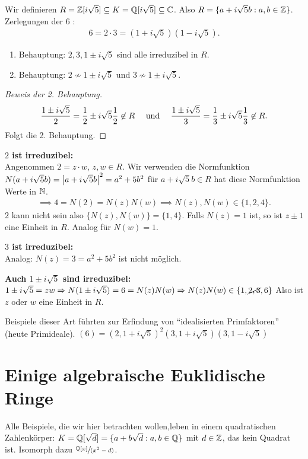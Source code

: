 \begin{eg}
Wir definieren $R = \Z[i \sqrt{5}] \subseteq K = \Q[i \sqrt{5}] \subseteq \C$.
Also  $R = \{a + i \sqrt{5} b : a,b \in \Z\}$.
Zerlegungen der $6$ :
\begin{align*}
	6 = 2 \cdot 3 = (1+ i \sqrt{5} )(1 - i \sqrt{5} )
.\end{align*}
\begin{enumerate}
	\item Behauptung: $2,3, 1 \pm i \sqrt{5} $ sind alle irreduzibel in $R$.
	\item Behauptung: $2 \not\sim 1 \pm i \sqrt{5}$ und $3 \not\sim 1 \pm i \sqrt{5}$.
\end{enumerate}

\begin{proof}[Beweis der 2. Behauptung]
	 \begin{align*}
		\frac{1 \pm i \sqrt{5} }{2} = \frac{1}{2} \pm i \sqrt{5} \frac{1}{2} \not\in R \qq{ und }
		\frac{1 \pm i \sqrt{5} }{3} = \frac{1}{3} \pm i \sqrt{5} \frac{1}{3} \not\in R
	.\end{align*}
	Folgt die 2. Behauptung.
\end{proof}

\textbf{$2$ ist irreduzibel:}\\
Angenommen $2 = z \cdot w$, $z,w \in R$.
Wir verwenden die Normfunktion $N(a+i \sqrt{5} b) = \abs{a + i\sqrt{5} b}^2 = a^2 + 5b^2$ für $a+i \sqrt{5} b \in R$ hat
diese Normfunktion Werte in $\N$.
\begin{align*}
	\implies 4 = N(2) = N(z) N(w) \implies N(z), N(w) \in \{1,2,4\}
.\end{align*}
$2$ kann nicht sein also $\{N(z), N(w)\} = \{1,4\} $.
Falls $N(z) = 1$ ist, so ist $z \pm 1$ eine Einheit in $R$.
Analog für $N(w) = 1$.

\textbf{$3$ ist irreduzibel:}\\
Analog: $N(z) = 3 = a^2 + 5 b^2$ ist nicht möglich.

\textbf{Auch $1 \pm i \sqrt{5}$ sind irreduzibel:}\\
$1 \pm i \sqrt{5} = zw \implies N(1 \pm i \sqrt{5} ) = 6 = N(z)N(w) \implies N(z)N(w) \in \{1,\cancel{2,3},6\} $
Also ist $z$ oder $w$ eine Einheit in $R$.

Beispiele dieser Art führten zur Erfindung von \enquote{idealisierten Primfaktoren} (heute Primideale).
$(6) = (2,1+ i\sqrt{5})^2(3,1+i\sqrt{5} )(3,1-i\sqrt{5})$
\end{eg}

\section{Einige algebraische Euklidische Ringe}
Alle Beispiele, die wir hier betrachten wollen,leben in einem quadratischen Zahlenkörper:
$ K = \Q[\sqrt{d}] = \{a + b\sqrt{d} :a,b \in \Q \} $ mit $d \in \Z$, das kein Quadrat ist.
Isomorph dazu $\sfrac{\Q[x]}{(x^2-d)}$.

